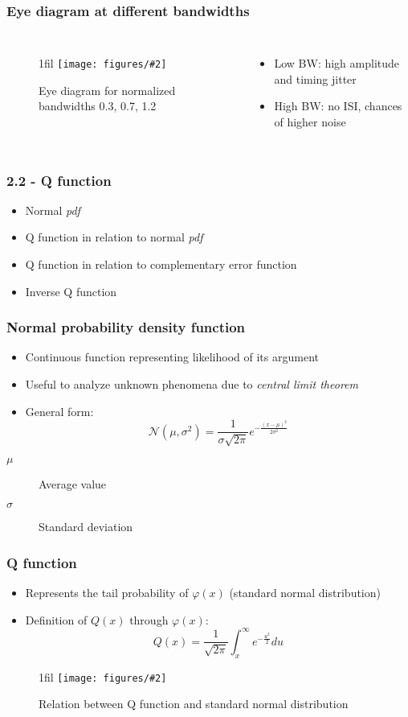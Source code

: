 \documentclass{beamer}
\makeatletter
\newcommand*{\centerfloat}{%
  \parindent \z@
  \leftskip \z@ \@plus 1fil \@minus \textwidth
  \rightskip\leftskip
  \parfillskip \z@skip}
\newcommand{\fig}[3]{
  \begin{figure}[H]
  \centerfloat
    \texttt{[image: figures/\#2]}
	\caption{#3}
  \end{figure}
}
\makeatother
\begin{document}
\begin{frame}
	\frametitle{Eye diagram at different bandwidths}
	\begin{columns}
			\fig{8cm}{eye2.png}{Eye diagram for normalized bandwidths 0.3, 0.7, 1.2}
			\begin{itemize}
				\item Low BW: high amplitude and timing jitter
				\item High BW: no ISI, chances of higher noise
			\end{itemize}
	\end{columns}
\end{frame}


\begin{frame}
	\frametitle{2.2 - Q function}
	\begin{Large}
		\begin{itemize}
			\item Normal \emph{pdf}
			\item Q function in relation to normal \emph{pdf}
			\item Q function in relation to complementary error function
			\item Inverse Q function
		\end{itemize}
	\end{Large}
\end{frame}

\begin{frame}
	\frametitle{Normal probability density function}
	\begin{itemize}
		\item Continuous function representing likelihood of its argument
		\item Useful to analyze unknown phenomena due to \emph{central limit theorem}
		\item General form:
		\begin{equation}
			\mathcal{N}(\mu, \sigma^2) = \frac{1}{\sigma \sqrt{2 \pi}} e^{-\frac{(x - \mu)^2}{2 \sigma^2}}
		\end{equation}
	\end{itemize}
	\begin{description}
		\item[$\mu$] Average value
		\item[$\sigma$] Standard deviation
	\end{description}
\end{frame}

\begin{frame}
	\frametitle{Q function}
	\begin{itemize}
		\item Represents the tail probability of  $\varphi(x)$ (standard normal distribution)
		\item Definition of $Q(x)$ through $\varphi(x)$:
		\begin{equation}
			Q(x) = \frac{1}{\sqrt{2 \pi}} \int_x^\infty e^{-\frac{u^2}{2}} du
		\end{equation}
	\end{itemize}
	\fig{2.5cm}{q1.png}{Relation between Q function and standard normal distribution}
\end{frame}
\end{document}
